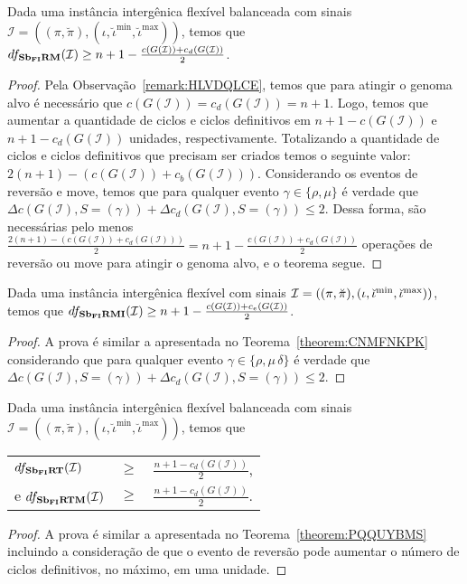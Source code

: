 \begin{theorem}\label{theorem:CNMFNKPK}
Dada uma instância intergênica flexível balanceada com sinais $\mathcal{I} = ((\pi,\breve\pi),(\iota,\breve\iota^{\min},\breve\iota^{\max}))$, temos que $df_{\textbf{Sb\textsubscript{FI}RM}}(\mathcal{I}) \ge {n+1} - \frac{c(G(\mathcal{I} )) + c_d(G(\mathcal{I} ))}{2}$.
\end{theorem}
\begin{proof}
Pela Observação~\ref{remark:HLVDQLCE}, temos que para atingir o genoma alvo é necessário que $c(G(\mathcal{I})) = c_d(G(\mathcal{I})) = n+1$. Logo, temos que aumentar a quantidade de ciclos e ciclos definitivos em ${n+1} - c(G(\mathcal{I}))$ e ${n+1} - c_d(G(\mathcal{I}))$ unidades, respectivamente. Totalizando a quantidade de ciclos e ciclos definitivos que precisam ser criados temos o seguinte valor: $2(n+1) - (c(G(\mathcal{I})) + c_b(G(\mathcal{I})))$. Considerando os eventos de reversão e move, temos que para qualquer evento $\gamma \in \{\rho, \mu\}$ é verdade que $\Delta c(G(\mathcal{I}), S=(\gamma)) + \Delta c_d(G(\mathcal{I}), S=(\gamma)) \le 2$. Dessa forma, são necessárias pelo menos $\frac{2({n+1}) - (c(G(\mathcal{I})) + c_d(G(\mathcal{I})))}{2} = {n+1} - \frac{c(G(\mathcal{I} )) + c_d(G(\mathcal{I} ))}{2}$ operações de reversão ou move para atingir o genoma alvo, e o teorema segue. 
\end{proof}

\begin{theorem}\label{theorem:XQPRYMFX}
Dada uma instância intergênica flexível com sinais $\mathcal{I} = ((\pi,\breve\pi),(\iota,\breve\iota^{\min},\break\breve\iota^{\max}))$, temos que $df_{\textbf{Sb\textsubscript{FI}RMI}}(\mathcal{I}) \ge {n+1} - \frac{c(G(\mathcal{I} )) + c_e(G(\mathcal{I} ))}{2}$.
\end{theorem}
\begin{proof}
A prova é similar a apresentada no Teorema~\ref{theorem:CNMFNKPK} considerando que para qualquer evento $\gamma \in \{\rho, \mu\,\delta\}$ é verdade que $\Delta c(G(\mathcal{I}), S=(\gamma)) + \Delta c_d(G(\mathcal{I}), S=(\gamma)) \le 2$.
\end{proof}

\begin{theorem}\label{theorem:HELIIGVZ}
Dada uma instância intergênica flexível balanceada com sinais $\mathcal{I} = ((\pi,\breve\pi),(\iota,\breve\iota^{\min},\breve\iota^{\max}))$, temos que

\begin{tabular}{lll}
  $df_{\textbf{Sb\textsubscript{FI}RT}}(\mathcal{I})$     & $ \ge $ & $\frac{{n+1} - c_d(G(\mathcal{I} ))}{2}$, \\
  e $df_{\textbf{Sb\textsubscript{FI}RTM}}(\mathcal{I})$  & $ \ge $ & $\frac{{n+1} - c_d(G(\mathcal{I} ))}{2}$. \\
\end{tabular}
\end{theorem}
\begin{proof}
A prova é similar a apresentada no Teorema~\ref{theorem:PQQUYBMS} incluindo a consideração de que o evento de reversão pode aumentar o número de ciclos definitivos, no máximo, em uma unidade.
\end{proof}


